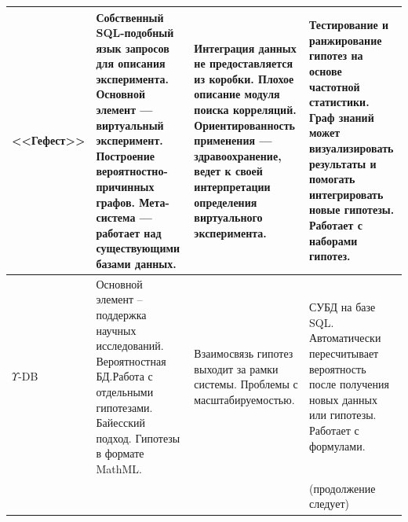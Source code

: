 \begin{table} [ht]
\begin{tabulary}{\textwidth}{@{}>{\zz}L >{\zz}L >{\zz}L >{\zz}L@{}}
        \\
        \midrule %
        <<Гефест>> &
        Собственный SQL-подобный язык запросов для описания эксперимента. Основной элемент --- виртуальный эксперимент. 
        Построение вероятностно-причинных графов. Мета-система --- работает над существующими базами данных. &
        Интеграция данных не предоставляется из коробки. Плохое описание модуля поиска корреляций. 
        Ориентированность применения --- здравоохранение, ведет к своей интерпретации определения виртуального эксперимента. &
        Тестирование и ранжирование гипотез на основе частотной статистики.
        Граф знаний может визуализировать результаты и помогать интегрировать новые гипотезы. Работает с наборами гипотез.
        \\
        \midrule
        $\Upsilon$-DB &
        Основной элемент – поддержка научных исследований. Вероятностная БД.Работа с отдельными гипотезами.
        Байесский подход. Гипотезы в формате MathML. &
        Взаимосвязь гипотез выходит за рамки системы. Проблемы с масштабируемостью. &
        СУБД на базе SQL. Автоматически пересчитывает вероятность после получения новых данных или гипотезы. Работает с формулами.
        \\
        \midrule
        & &  & \scriptsize (продолжение следует)
        \\
        \bottomrule %
	\end{tabulary}%
\end{table}

